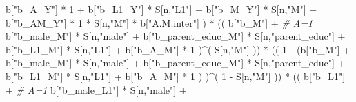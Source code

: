 \documentclass[
]{book}
\newenvironment{Shaded}{\begin{snugshade}}{\end{snugshade}}
\newcommand{\CommentTok}[1]{\textcolor[rgb]{0.56,0.35,0.01}{\textit{#1}}}
\newcommand{\DecValTok}[1]{\textcolor[rgb]{0.00,0.00,0.81}{#1}}
\newcommand{\NormalTok}[1]{#1}
\newcommand{\SpecialCharTok}[1]{\textcolor[rgb]{0.00,0.00,0.00}{#1}}
\newcommand{\StringTok}[1]{\textcolor[rgb]{0.31,0.60,0.02}{#1}}
\begin{document}
\begin{Shaded}
\begin{Highlighting}[]
\NormalTok{                             b[}\StringTok{"b\_A\_Y"}\NormalTok{] }\SpecialCharTok{*} \DecValTok{1} \SpecialCharTok{+} 
\NormalTok{                             b[}\StringTok{"b\_L1\_Y"}\NormalTok{] }\SpecialCharTok{*}\NormalTok{ S[n,}\StringTok{"L1"}\NormalTok{] }\SpecialCharTok{+}
\NormalTok{                             b[}\StringTok{"b\_M\_Y"}\NormalTok{] }\SpecialCharTok{*}\NormalTok{ S[n,}\StringTok{"M"}\NormalTok{] }\SpecialCharTok{+}
\NormalTok{                             b[}\StringTok{"b\_AM\_Y"}\NormalTok{] }\SpecialCharTok{*} \DecValTok{1} \SpecialCharTok{*}\NormalTok{ S[n,}\StringTok{"M"}\NormalTok{] }\SpecialCharTok{*}\NormalTok{ b[}\StringTok{"A.M.inter"}\NormalTok{] ) }\SpecialCharTok{*}
\NormalTok{      (( b[}\StringTok{"b\_M"}\NormalTok{] }\SpecialCharTok{+}                                                             \CommentTok{\# A\textquotesingle{}=1}
\NormalTok{           b[}\StringTok{"b\_male\_M"}\NormalTok{] }\SpecialCharTok{*}\NormalTok{ S[n,}\StringTok{"male"}\NormalTok{] }\SpecialCharTok{+} 
\NormalTok{           b[}\StringTok{"b\_parent\_educ\_M"}\NormalTok{] }\SpecialCharTok{*}\NormalTok{ S[n,}\StringTok{"parent\_educ"}\NormalTok{] }\SpecialCharTok{+} 
\NormalTok{           b[}\StringTok{"b\_L1\_M"}\NormalTok{] }\SpecialCharTok{*}\NormalTok{ S[n,}\StringTok{"L1"}\NormalTok{] }\SpecialCharTok{+}
\NormalTok{           b[}\StringTok{"b\_A\_M"}\NormalTok{] }\SpecialCharTok{*} \DecValTok{1}\NormalTok{ )}\SpecialCharTok{\^{}}\NormalTok{( S[n,}\StringTok{"M"}\NormalTok{] )) }\SpecialCharTok{*}
\NormalTok{      (( }\DecValTok{1} \SpecialCharTok{{-}}\NormalTok{ (b[}\StringTok{"b\_M"}\NormalTok{] }\SpecialCharTok{+} 
\NormalTok{                b[}\StringTok{"b\_male\_M"}\NormalTok{] }\SpecialCharTok{*}\NormalTok{ S[n,}\StringTok{"male"}\NormalTok{] }\SpecialCharTok{+} 
\NormalTok{                b[}\StringTok{"b\_parent\_educ\_M"}\NormalTok{] }\SpecialCharTok{*}\NormalTok{ S[n,}\StringTok{"parent\_educ"}\NormalTok{] }\SpecialCharTok{+} 
\NormalTok{                b[}\StringTok{"b\_L1\_M"}\NormalTok{] }\SpecialCharTok{*}\NormalTok{ S[n,}\StringTok{"L1"}\NormalTok{] }\SpecialCharTok{+}
\NormalTok{                b[}\StringTok{"b\_A\_M"}\NormalTok{] }\SpecialCharTok{*} \DecValTok{1}\NormalTok{ ) )}\SpecialCharTok{\^{}}\NormalTok{( }\DecValTok{1} \SpecialCharTok{{-}}\NormalTok{ S[n,}\StringTok{"M"}\NormalTok{] )) }\SpecialCharTok{*}
\NormalTok{      (( b[}\StringTok{"b\_L1"}\NormalTok{] }\SpecialCharTok{+}                                                            \CommentTok{\# A=1}
\NormalTok{           b[}\StringTok{"b\_male\_L1"}\NormalTok{] }\SpecialCharTok{*}\NormalTok{ S[n,}\StringTok{"male"}\NormalTok{] }\SpecialCharTok{+}  

\end{Highlighting}
\end{Shaded}
\end{document}
